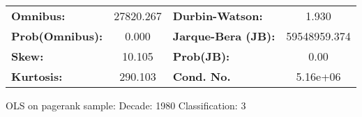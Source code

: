 \begin{center}
\begin{tabular}{lccccc}
\end{tabular}
\begin{tabular}{lclc}
\textbf{Omnibus:}       & 27820.267 & \textbf{  Durbin-Watson:     } &      1.930    \\
\textbf{Prob(Omnibus):} &    0.000  & \textbf{  Jarque-Bera (JB):  } & 59548959.374  \\
\textbf{Skew:}          &   10.105  & \textbf{  Prob(JB):          } &       0.00    \\
\textbf{Kurtosis:}      &  290.103  & \textbf{  Cond. No.          } &   5.16e+06    \\
\bottomrule
\end{tabular}
\end{center}
\break
OLS on pagerank sample: Decade: 1980 Classification: 3
